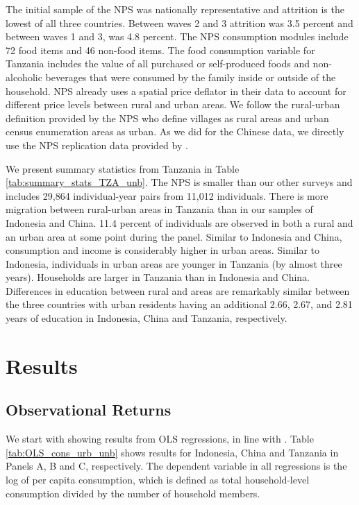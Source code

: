\documentclass[12pt]{article}
\begin{document}
The initial sample of the NPS was nationally representative and attrition is the lowest of all three countries.  Between waves 2 and 3 attrition was 3.5 percent and between waves 1 and 3, was 4.8 percent. The NPS consumption modules include 72 food items and 46 non-food items.
The food consumption variable for Tanzania includes the value of all purchased or self-produced foods and non-alcoholic beverages that were consumed by the family inside or outside of the household. 
NPS already uses a spatial price deflator in their data to account for different price levels between rural and urban areas. 
We follow the rural-urban definition provided by the NPS who define villages as rural areas and urban census enumeration areas as urban.
As we did for the Chinese data, we directly use the NPS replication data provided by \cite{lagakosMigrationCostsObservational2020}.



We present summary statistics from Tanzania in Table \ref{tab:summary_stats_TZA_unb}. The NPS is smaller than our other surveys and includes 29,864 individual-year pairs from 11,012 individuals. There is more migration between rural-urban areas in Tanzania than in our samples of Indonesia and China. 11.4 percent of individuals are observed in both a rural and an urban area at some point during the panel.  Similar to Indonesia and China, consumption and income is considerably higher in urban areas. Similar to Indonesia, individuals in urban areas are younger in Tanzania (by almost three years). Households are larger in Tanzania than in Indonesia and China. Differences in education between rural and areas are remarkably similar between the three countries with urban residents having an additional 2.66, 2.67, and 2.81 years of education in Indonesia, China and Tanzania, respectively.





\section{Results}\label{sec:results}

\subsection{Observational Returns}\label{sec:observational-returns}

We start with showing results from OLS regressions, in line with 
\cite{hamoryReevaluatingAgriculturalProductivity2021}. 
Table \ref{tab:OLS_cons_urb_unb} shows results for Indonesia, China and Tanzania in Panels A, B and C, respectively. 
The dependent variable in all regressions is the log of per capita consumption, which is defined as total household-level consumption divided by the number of household members. 
\end{document}
